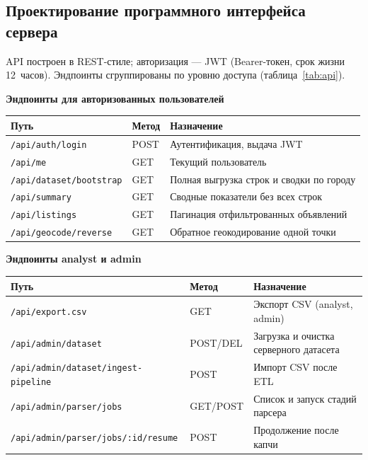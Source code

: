 \subsection{Проектирование программного интерфейса сервера}

API построен в REST-стиле; авторизация --- JWT (Bearer-токен, срок жизни 12~часов). Эндпоинты сгруппированы по уровню доступа (таблица~\ref{tab:api}).

\begin{table}[htbp]
\centering
\footnotesize
\setlength{\tabcolsep}{3pt}
\textbf{Эндпоинты для авторизованных пользователей}\\[3pt]
\begin{tabular}{|L{0.34\textwidth}|L{0.11\textwidth}|L{0.49\textwidth}|}
\hline
\textbf{Путь} & \textbf{Метод} & \textbf{Назначение} \\
\hline
\texttt{/api/auth/login} & POST & Аутентификация, выдача JWT \\
\hline
\texttt{/api/me} & GET & Текущий пользователь \\
\hline
\texttt{/api/dataset/bootstrap} & GET & Полная выгрузка строк и сводки по городу \\
\hline
\texttt{/api/summary} & GET & Сводные показатели без всех строк \\
\hline
\texttt{/api/listings} & GET & Пагинация отфильтрованных объявлений \\
\hline
\texttt{/api/geocode/reverse} & GET & Обратное геокодирование одной точки \\
\hline
\end{tabular}

\medskip
\textbf{Эндпоинты analyst и admin}\\[3pt]
\begin{tabular}{|L{0.34\textwidth}|L{0.11\textwidth}|L{0.49\textwidth}|}
\hline
\textbf{Путь} & \textbf{Метод} & \textbf{Назначение} \\
\hline
\texttt{/api/export.csv} & GET & Экспорт CSV (analyst, admin) \\
\hline
\texttt{/api/admin/dataset} & POST/DEL & Загрузка и очистка серверного датасета \\
\hline
\texttt{/api/admin/dataset/}\newline\texttt{ingest-pipeline} & POST & Импорт CSV после ETL \\
\hline
\texttt{/api/admin/parser/jobs} & GET/POST & Список и запуск стадий парсера \\
\hline
\texttt{/api/admin/parser/jobs/}\newline\texttt{:id/resume} & POST & Продолжение после капчи \\
\hline
\end{tabular}


\end{table}

